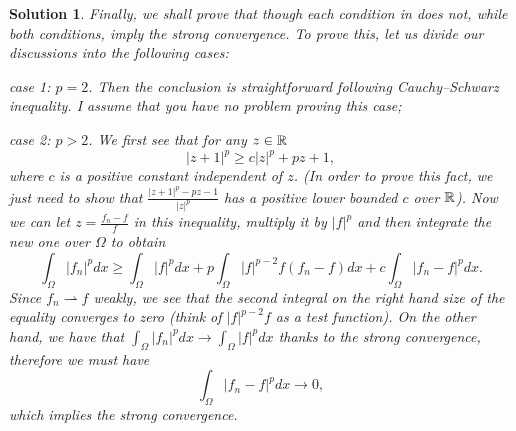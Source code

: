 \documentclass[6pt]{article}
\newtheorem{solution}{Solution}
\numberwithin{equation}{section}
\def\mathbb{\Bbb}
\begin{document}
\begin{enumerate}
\begin{solution}
Finally, we shall prove that though each condition in does not, while both conditions, imply the strong convergence.  To prove this, let us divide our discussions into the following cases:

case 1: $p=2$.  Then the conclusion is straightforward following Cauchy--Schwarz inequality.  I assume that you have no problem proving this case;

case 2: $p>2$.  We first see that for any $z\in \mathbb R$
\[|z+1|^p\geq c|z|^p+pz+1,\]
where $c$ is a positive constant independent of $z$.  (In order to prove this fact, we just need to show that $\frac{|z+1|^p-pz-1}{|z|^p}$ has a positive lower bounded $c$ over $\mathbb R$).  Now we can let $z=\frac{f_n-f}{f}$ in this inequality, multiply it by $|f|^p$ and then integrate the new one over $\Omega$ to obtain
\[\int_\Omega|f_n|^pdx\geq \int_\Omega |f|^pdx+p\int_\Omega |f|^{p-2}f(f_n-f)dx+c\int_\Omega |f_n-f|^pdx.\]
Since $f_n \rightharpoonup f$ weakly, we see that the second integral on the right hand size of the equality converges to zero (think of $|f|^{p-2}f$ as a test function).  On the other hand, we have that $\int_\Omega |f_n|^pdx\rightarrow \int_\Omega |f|^pdx$ thanks to the strong convergence, therefore we must have
\[\int_\Omega |f_n-f|^pdx\rightarrow 0,\]
which implies the strong convergence.


\end{solution}
\end{enumerate}
\end{document}
